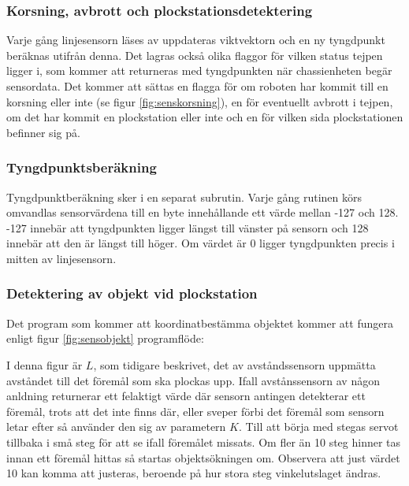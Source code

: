 
\subsubsection{Korsning, avbrott och plockstationsdetektering}

Varje gång linjesensorn läses av uppdateras viktvektorn och en ny tyngdpunkt beräknas utifrån denna. Det lagras också olika flaggor för vilken status tejpen ligger i, som kommer att returneras med tyngdpunkten när chassienheten begär sensordata. Det kommer att sättas en flagga för om roboten har kommit till en korsning eller inte (se figur \ref{fig:senskorsning}), en för eventuellt avbrott i tejpen, om det har kommit en plockstation eller inte och en för vilken sida plockstationen befinner sig på.



\subsubsection{Tyngdpunktsberäkning}

Tyngdpunktberäkning sker i en separat subrutin. Varje gång rutinen körs omvandlas sensorvärdena till en byte innehållande ett värde mellan -127 och 128. -127 innebär att tyngdpunkten ligger längst till vänster på sensorn och 128 innebär att den är längst till höger. Om värdet är 0 ligger tyngdpunkten precis i mitten av linjesensorn.


\subsubsection{Detektering av objekt vid plockstation}

Det program som kommer att koordinatbestämma objektet kommer att fungera enligt figur \ref{fig:sensobjekt} programflöde:



I denna figur är $L$, som tidigare beskrivet, det av avståndssensorn uppmätta avståndet till det föremål som ska plockas upp. Ifall avstånssensorn av någon anldning returnerar ett felaktigt värde där sensorn antingen detekterar ett föremål, trots att det inte finns där, eller sveper förbi det föremål som sensorn letar efter så använder den sig av parametern $K$. Till att börja med stegas servot tillbaka i små steg för att se ifall föremålet missats. Om fler än 10 steg hinner tas innan ett föremål hittas så startas objektsökningen om. Observera att just värdet 10 kan komma att justeras, beroende på hur stora steg vinkelutslaget ändras.

